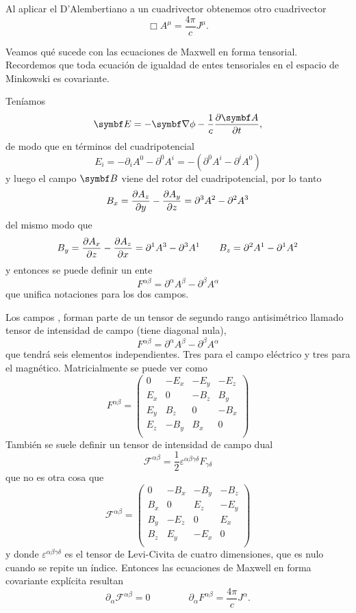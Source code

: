 \documentclass[10pt,oneside]{CBFT_book}
\begin{document}
Al aplicar el D'Alembertiano a un cuadrivector obtenemos otro cuadrivector 
\[
	\Box A^\mu = \frac{4\pi}{c} J^\mu.
\]


Veamos qué sucede con las ecuaciones de Maxwell en forma tensorial.
Recordemos que toda ecuación de igualdad de entes tensoriales en el espacio
de Minkowski es covariante.

Teníamos
\[
	\vb{E} = -\Nabla \phi - \frac{1}{c}\dpar{\vb{A}}{t}, 
\]
de modo que en términos del cuadripotencial
\[
	E_i = - \partial_i A^0 -\partial^0 A^i = -( \partial^0 A^i - \partial^i A^0)
\]
y luego el campo $\vb{B}$ viene del rotor del cuadripotencial, por lo tanto
\[
	B_x = \frac{\partial^{\hspace{-0.05em}} {A_z}}{\partial {y}^{\hspace{-0.05em}}} - \frac{\partial^{\hspace{-0.05em}} {A_y}}{\partial {z}^{\hspace{-0.05em}}} = \partial^3A^2 - \partial^2A^3
\]
del mismo modo que
\[
	B_y = \frac{\partial^{\hspace{-0.05em}} {A_x}}{\partial {z}^{\hspace{-0.05em}}} - \frac{\partial^{\hspace{-0.05em}} {A_z}}{\partial {x}^{\hspace{-0.05em}}} = \partial^1A^3 - \partial^3A^1 \qquad 
	B_z = \partial^2A^1 - \partial^1A^2
\]
y entonces se puede definir un ente
\[
	F^{\alpha\beta} = \partial^\alpha A^\beta - \partial^\beta A^\alpha
\]
que unifica notaciones para los dos campos.

Los campos ,  forman parte de un tensor de segundo rango antisimétrico llamado tensor
de intensidad de campo (tiene diagonal nula),
\[
	F^{\alpha\beta} = \partial^\alpha A^\beta - \partial^\beta A^\alpha
\]
que tendrá seis elementos independientes. Tres para el campo eléctrico y tres para el magnético.
Matricialmente se puede ver como 
\[
	F^{\alpha\beta} =
	\begin{pmatrix}
	 0 & -E_x & -E_y & -E_z \\
	 E_x & 0 & -B_z & B_y \\
	 E_y & B_z & 0 & -B_x \\
	 E_z & -B_y & B_x & 0 \\
	\end{pmatrix}
\]
También se suele definir un tensor de intensidad de campo dual
\[
	\mathcal{F}^{\alpha\beta} =  \frac{1}{2} \varepsilon^{\alpha\beta\gamma\delta} F_{\gamma\delta}
\]
que no es otra cosa que 
\[
	\mathcal{F}^{\alpha\beta}=
	\begin{pmatrix}
	 0 & -B_x & -B_y & -B_z \\
	 B_x & 0 & E_z & -E_y \\
	 B_y & -E_z & 0 & E_x \\
	 B_z & E_y & -E_x & 0 \\
	\end{pmatrix}
\]
y donde $\varepsilon^{\alpha\beta\gamma\delta}$ es el tensor de Levi-Civita de cuatro dimensiones, que es nulo
cuando se repite un índice.
Entonces las ecuaciones de Maxwell en forma covariante explícita resultan 
\[
	\partial_\alpha \mathcal{F}^{\alpha\beta} =  0 \qquad \qquad 
	\partial_\alpha F^{\alpha\beta} =  \frac{4 \pi}{c} J^\alpha.
\]
\end{document}

